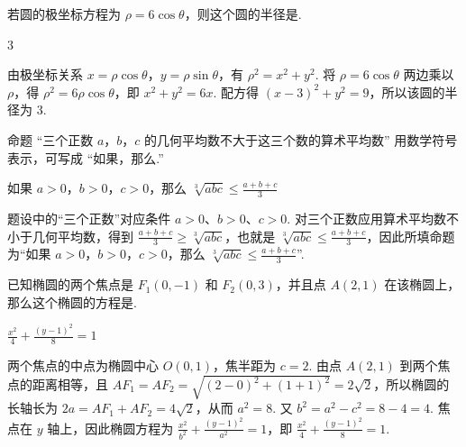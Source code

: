 \begin{problem}

若圆的极坐标方程为 \(\rho = 6\cos\theta \)，则这个圆的半径是\fillinblank{}.
\end{problem}

\begin{answer}
\(3\)
\end{answer}

\begin{solution}
由极坐标关系 \(x=\rho\cos\theta\)，\(y=\rho\sin\theta\)，有 \(\rho^{2}=x^{2}+y^{2}\). 将 \(\rho=6\cos\theta\) 两边乘以 \(\rho\)，得 \(\rho^{2}=6\rho\cos\theta\)，即 \(x^{2}+y^{2}=6x\). 配方得 \((x-3)^{2}+y^{2}=9\)，所以该圆的半径为 \(3\).
\end{solution}

\begin{problem}

命题 “三个正数 \(a\)，\(b\)，\(c\) 的几何平均数不大于这三个数的算术平均数” 用数学符号表示，可写成 “如果\fillinblank{}，那么\fillinblank{}.”
\end{problem}

\begin{answer}
如果 \(a>0\)，\(b>0\)，\(c>0\)，那么 \(\sqrt[3]{abc}\leqslant\frac{a+b+c}{3}\)
\end{answer}

\begin{solution}
题设中的“三个正数”对应条件 \(a>0\)、\(b>0\)、\(c>0\). 对三个正数应用算术平均数不小于几何平均数，得到 \(\frac{a+b+c}{3}\geqslant\sqrt[3]{abc}\)，也就是 \(\sqrt[3]{abc}\leqslant\frac{a+b+c}{3}\)，因此所填命题为“如果 \(a>0\)，\(b>0\)，\(c>0\)，那么 \(\sqrt[3]{abc}\leqslant\frac{a+b+c}{3}\)”.
\end{solution}

\begin{problem}

已知椭圆的两个焦点是 \(F_{1}(0,-1) \) 和 \(F_{2}(0,3) \)，并且点 \(A(2,1) \) 在该椭圆上，那么这个椭圆的方程是\fillinblank{}.
\end{problem}

\begin{answer}
\(\frac{x^{2}}{4}+\frac{(y-1)^{2}}{8}=1\)
\end{answer}

\begin{solution}
两个焦点的中点为椭圆中心 \(O(0,1)\)，焦半距为 \(c=2\). 由点 \(A(2,1)\) 到两个焦点的距离相等，且
\(AF_{1}=AF_{2}=\sqrt{(2-0)^{2}+(1+1)^{2}}=2\sqrt{2}\)，所以椭圆的长轴长为 \(2a=AF_{1}+AF_{2}=4\sqrt{2}\)，从而 \(a^{2}=8\). 又 \(b^{2}=a^{2}-c^{2}=8-4=4\). 焦点在 \(y\) 轴上，因此椭圆方程为 \(\frac{x^{2}}{b^{2}}+\frac{(y-1)^{2}}{a^{2}}=1\)，即 \(\frac{x^{2}}{4}+\frac{(y-1)^{2}}{8}=1\).
\end{solution}

